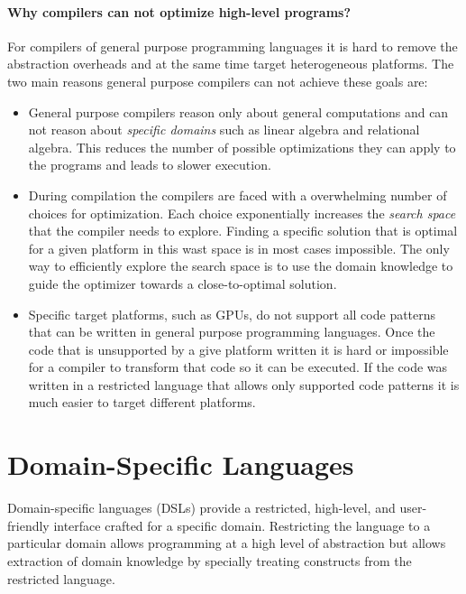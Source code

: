 \paragraph{Why compilers can not optimize high-level programs?} For compilers of general purpose programming languages it is hard to remove the abstraction overheads and at the same time target heterogeneous platforms. The two main reasons general purpose compilers can not achieve these goals are:\begin{itemize}

 \item General purpose compilers reason only about general computations and can not reason
   about \emph{specific domains} such as linear algebra and relational algebra. This reduces
   the number of possible optimizations they can apply to the programs and leads to
   slower execution.

 \item During compilation the compilers are faced with a overwhelming number of choices
   for optimization. Each choice exponentially increases the \emph{search space}
   that the compiler needs to explore. Finding a specific solution that is optimal
   for a given platform in this wast space is in most cases impossible. The only way
   to efficiently explore the search space is to use the domain knowledge to guide
   the optimizer towards a close-to-optimal solution.

  \item Specific target platforms, such as GPUs, do not support all code patterns
  that can be written in general purpose programming languages. Once the code that
  is unsupported by a give platform written it is hard or impossible for a compiler
  to transform that code so it can be executed. If the code was written in a restricted
  language that allows only supported code patterns it is much easier to target different
  platforms.
 \end{itemize}

\section{Domain-Specific Languages}
\label{sec:domain-specific-languages}

Domain-specific languages (DSLs) provide a restricted,
 high-level, and user-friendly interface crafted for a specific domain.
 Restricting the language to a particular domain allows programming at
 a high level of abstraction but allows extraction of domain knowledge by
 specially treating constructs from the restricted language.

